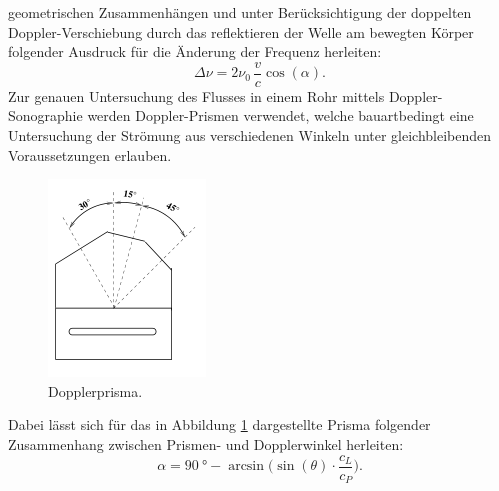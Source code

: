 geometrischen Zusammenhängen und unter Berücksichtigung der doppelten Doppler-Verschiebung durch das reflektieren der Welle am bewegten Körper folgender Ausdruck für die Änderung der Frequenz
herleiten:
\begin{equation}
  \Delta\nu = 2 \nu_0\, \frac{v}{c} \cos(\alpha) .
  \label{eqn:deltanu}
\end{equation}
Zur genauen Untersuchung des Flusses in einem Rohr mittels Doppler-Sonographie werden Doppler-Prismen verwendet, welche bauartbedingt eine Untersuchung der Strömung aus verschiedenen Winkeln
unter gleichbleibenden Voraussetzungen erlauben.
\begin{figure}
  \centering
  \includegraphics{images/prisma.png}
  \caption{Dopplerprisma.\cite{sample}}
  \label{fig:prisma}
\end{figure}
Dabei lässt sich für das in Abbildung \ref{fig:prisma} dargestellte Prisma folgender Zusammenhang zwischen Prismen- und Dopplerwinkel herleiten:
\begin{equation}
  \alpha = \SI{90}{\degree} - \arcsin\bigl(\sin(\theta)\cdot\frac{c_L}{c_P}\bigr) .
  \label{eqn:prisma}
\end{equation}

